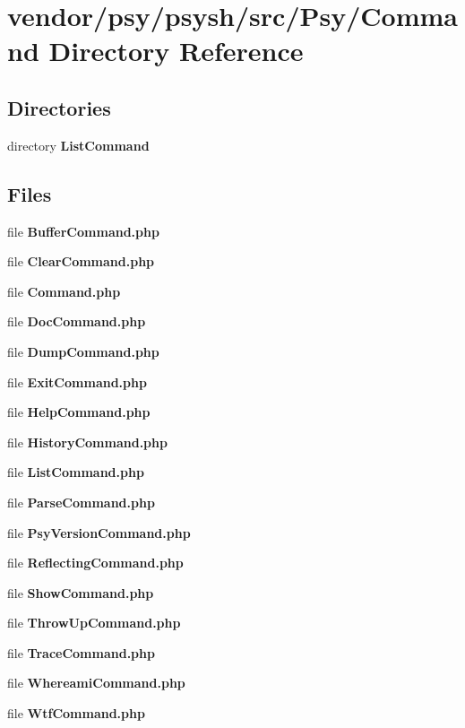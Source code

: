 \section{vendor/psy/psysh/src/\+Psy/\+Command Directory Reference}
\label{dir_0cd9b060bf5441c0da4b1f1bfffa5600}
\subsection*{Directories}
\begin{DoxyCompactItemize}
\item 
directory {\bf List\+Command}
\end{DoxyCompactItemize}
\subsection*{Files}
\begin{DoxyCompactItemize}
\item 
file {\bf Buffer\+Command.\+php}
\item 
file {\bf Clear\+Command.\+php}
\item 
file {\bf Command.\+php}
\item 
file {\bf Doc\+Command.\+php}
\item 
file {\bf Dump\+Command.\+php}
\item 
file {\bf Exit\+Command.\+php}
\item 
file {\bf Help\+Command.\+php}
\item 
file {\bf History\+Command.\+php}
\item 
file {\bf List\+Command.\+php}
\item 
file {\bf Parse\+Command.\+php}
\item 
file {\bf Psy\+Version\+Command.\+php}
\item 
file {\bf Reflecting\+Command.\+php}
\item 
file {\bf Show\+Command.\+php}
\item 
file {\bf Throw\+Up\+Command.\+php}
\item 
file {\bf Trace\+Command.\+php}
\item 
file {\bf Whereami\+Command.\+php}
\item 
file {\bf Wtf\+Command.\+php}
\end{DoxyCompactItemize}
